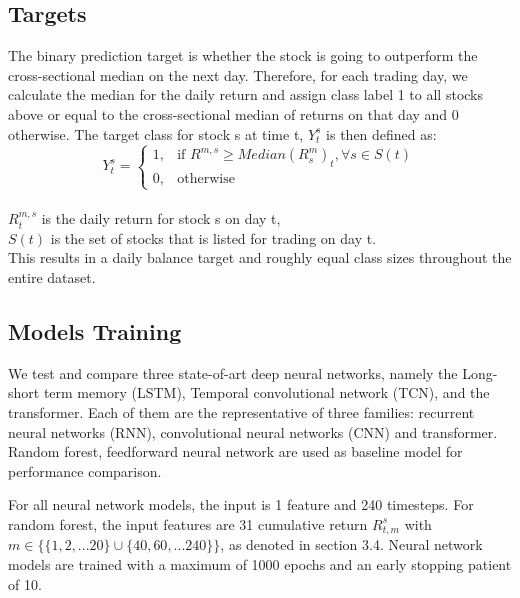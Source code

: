 \documentclass{article}
\begin{document}
\subsection{Targets}
The binary prediction target is whether the stock is going to outperform the cross-sectional median on the next day. Therefore, for each trading day, we calculate the median for the daily return and assign class label 1 to all stocks above or equal to the cross-sectional median of returns on that day and 0 otherwise. The target class for stock s at time t, \begin{math} Y^{s}_{t} \end{math} is then defined as:
\[Y^{s}_{t} = \begin{cases}
    1, & \text{if } R^{m,s} \geq Median (R^{m}_{s})_t, \forall s \in S(t)\\ 
    0, & \text{otherwise} 
    \end{cases}\]\\
$R^{m,s}_t$ is the daily return for stock s on day t, \\
$S(t)$ is the set of stocks that is listed for trading on day t.\\

This results in a daily balance target and roughly equal class sizes throughout the entire dataset.

\subsection{Models Training}
We test and compare three state-of-art deep neural networks, namely the Long-short term memory (LSTM), Temporal convolutional network (TCN), and the transformer. Each of them are the representative of three families: recurrent neural networks (RNN), convolutional neural networks (CNN) and transformer. Random forest, feedforward neural network are used as baseline model for performance comparison. 

For all neural network models, the input is 1 feature and 240 timesteps. For random forest, the input features are 31 cumulative return $R^s_{t,m}$ with $m \in \{\{1,2,...20\} \cup \{40,60,...240\}\} $, as denoted in section 3.4. Neural network models are trained with a maximum of 1000 epochs and an early stopping patient of 10. 
\end{document}
